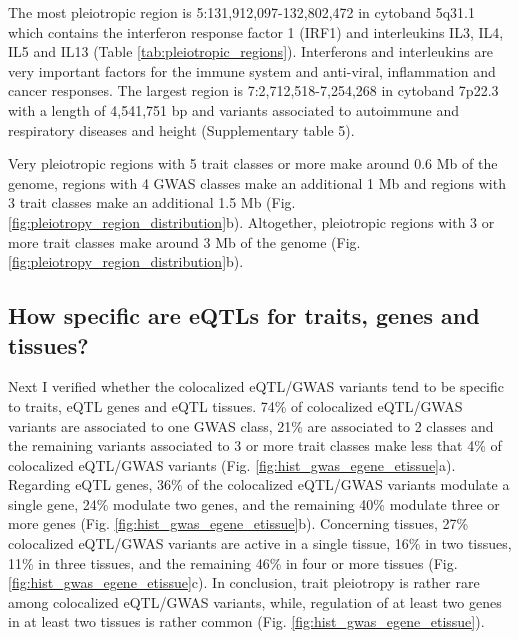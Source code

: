 The most pleiotropic region is 5:131,912,097-132,802,472 in cytoband 5q31.1 which contains the interferon response factor 1
(IRF1) and interleukins IL3, IL4, IL5 and IL13 (Table \ref{tab:pleiotropic_regions}).
%
Interferons and interleukins are very important factors for the immune system and anti-viral, inflammation and cancer responses.
%
The largest region is 7:2,712,518-7,254,268 in cytoband 7p22.3 with a length of 4,541,751 bp and variants associated to
autoimmune and respiratory diseases and height (Supplementary table 5).

Very pleiotropic regions with 5 trait classes or more make around 0.6 Mb of the genome,
regions with 4 GWAS classes make an additional 1 Mb and regions with 3 trait classes make an additional 1.5 Mb (Fig. \ref{fig:pleiotropy_region_distribution}b).
%
Altogether, pleiotropic regions with 3 or more trait classes make around 3 Mb of the genome (Fig. \ref{fig:pleiotropy_region_distribution}b).

%
\subsection*{How specific are eQTLs for traits, genes and tissues?}
%

Next I verified whether the colocalized eQTL/GWAS variants tend to be specific to traits, eQTL genes and eQTL tissues.
%
74\% of colocalized eQTL/GWAS variants are associated to one GWAS class, 21\% are associated to 2 classes and the remaining variants associated to
3 or more trait classes make less that 4\% of colocalized eQTL/GWAS variants (Fig. \ref{fig:hist_gwas_egene_etissue}a).
%
Regarding eQTL genes, 36\% of the colocalized eQTL/GWAS variants modulate a single gene, 24\% modulate two genes, and the
remaining 40\% modulate three or more genes (Fig. \ref{fig:hist_gwas_egene_etissue}b).
%
Concerning tissues, 27\% colocalized eQTL/GWAS variants are active in a single tissue, 16\% in two tissues, 11\% in three
tissues, and the remaining 46\% in four or more tissues (Fig. \ref{fig:hist_gwas_egene_etissue}c).
%
In conclusion, trait pleiotropy is rather rare among colocalized eQTL/GWAS variants, while, regulation of at least two
genes in at least two tissues is rather common (Fig. \ref{fig:hist_gwas_egene_etissue}).

%
